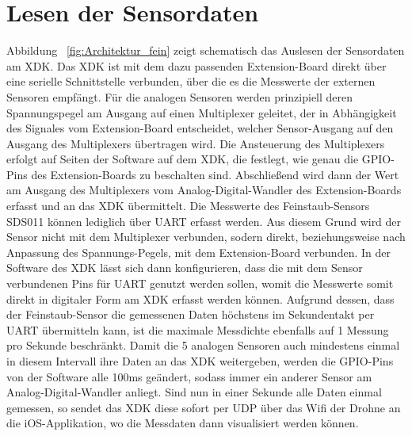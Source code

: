 \section{Lesen der Sensordaten}\label{sec:Lesen der Sensordaten}
Abbildung ~\ref{fig:Architektur_fein} zeigt schematisch das Auslesen der Sensordaten am \acs{XDK}. Das XDK ist mit dem dazu passenden Extension-Board direkt über eine serielle Schnittstelle verbunden, über die es die Messwerte der externen Sensoren empfängt. 
\newline
Für die analogen Sensoren werden prinzipiell deren Spannungspegel am Ausgang auf einen Multiplexer geleitet, der in Abhängigkeit des Signales vom Extension-Board entscheidet, welcher Sensor-Ausgang auf den Ausgang des Multiplexers übertragen wird. Die Ansteuerung des Multiplexers erfolgt auf Seiten der Software auf dem \acs{XDK}, die festlegt, wie genau die \acs{GPIO}-Pins des Extension-Boards zu beschalten sind. Abschließend wird dann der Wert am Ausgang des Multiplexers vom Analog-Digital-Wandler des Extension-Boards erfasst und an das \acs{XDK} übermittelt.
\newline
Die Messwerte des Feinstaub-Sensors SDS011 können lediglich über \acs{UART} erfasst werden. Aus diesem Grund wird der Sensor nicht mit dem Multiplexer verbunden, sodern direkt, beziehungsweise nach Anpassung des Spannungs-Pegels, mit dem Extension-Board verbunden. In der Software des \acs{XDK} lässt sich dann konfigurieren, dass die mit dem Sensor verbundenen Pins für \acs{UART} genutzt werden sollen, womit die Messwerte somit direkt in digitaler Form am XDK erfasst werden können.
\newline
Aufgrund dessen, dass der Feinstaub-Sensor die gemessenen Daten höchstens im Sekundentakt per UART übermitteln kann, ist die maximale Messdichte ebenfalls auf 1 Messung pro Sekunde beschränkt. Damit die 5 analogen Sensoren auch mindestens einmal in diesem Intervall ihre Daten an das XDK weitergeben, werden die \acs{GPIO}-Pins von der Software alle 100ms geändert, sodass immer ein anderer Sensor am Analog-Digital-Wandler anliegt. 
\newline
Sind nun in einer Sekunde alle Daten einmal gemessen, so sendet das \acs{XDK} diese sofort per \acs{UDP} über das Wifi der Drohne an die iOS-Applikation, wo die Messdaten dann visualisiert werden können.

